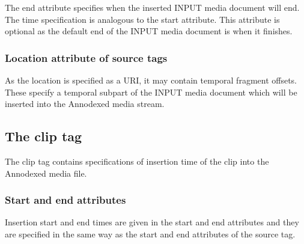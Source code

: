 The end attribute specifies when the inserted INPUT media document will end. The time specification is analogous to the start attribute. This attribute is optional as the default end of the INPUT media document is when it finishes.\subsubsection{Location attribute of source tags}\label{loc}
As the location is specified as a URI, it may contain temporal fragment offsets. These specify a temporal subpart of the INPUT media document which will be inserted into the Annodexed media stream.\subsection{The clip tag}\label{clip}
The clip tag contains specifications of insertion time of the clip into the Annodexed media file.\subsubsection{Start and end attributes}\label{clipstart}
Insertion start and end times are given in the start and end attributes and they are specified in the same way as the start and end attributes of the source tag. 